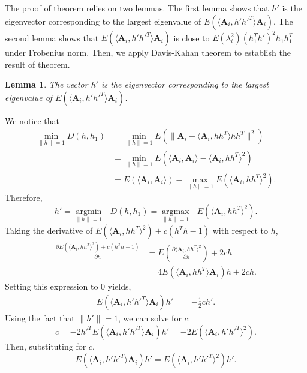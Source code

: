 \documentclass[10pt,journal,compsoc]{IEEEtran}
\newtheorem{lemma}[theorem]{Lemma}
\newenvironment{proof}[1][Proof]{\begin{trivlist}
		\item[\hskip \labelsep {\bfseries #1}]}{\end{trivlist}}
\newcommand{\bA}{\mathbf{A}}
\begin{document}
\begin{proof} [Proof of Theorem 4.2]
The proof of theorem relies on two lemmas. The first lemma shows that
$h'$ is the eigenvector corresponding to the largest eigenvalue of $E(\langle \bA_{i},h' h'^T \rangle \bA_{i})$. The second lemma shows that $E(\langle \bA_{i},h' h'^T \rangle \bA_{i})$ is close to $E(\lambda_i^2) (h_1^Th')^2 h_1 h_1^T$ under Frobenius norm. Then, we apply Davis-Kahan theorem \cite{davis1970rotation} to establish the result of theorem.\\
\begin{lemma}
	The vector $h'$ is the eigenvector corresponding to the largest eigenvalue of $E(\langle \bA_{i},h' h'^T \rangle \bA_{i})$.
\end{lemma}
	We notice that
	\begin{align*}
	\underset{\|h\| =1}{\operatorname{min}}D(h,h_1) &=\underset{\|h\| =1}{\operatorname{min}}E(\|\bA_i- \langle \bA_i,h h^T \rangle h h^T\|^2) \\
	&=\underset{\|h\| =1}{\operatorname{min}}E(\langle \bA_i,\bA_i \rangle- \langle \bA_i,h h^T \rangle ^2) \\
	&=E(\langle \bA_i,\bA_i \rangle)-\underset{\|h\| =1}{\operatorname{max}}E( \langle \bA_i,h h^T \rangle ^2).
	\end{align*}
	Therefore, 
	\begin{equation} \label{eq:5}
	h'= \underset{\|h\| =1}{\operatorname{argmin}} \text{ }D(h,h_1)=\underset{\|h\| =1}{\operatorname{argmax}} \text{ } E(\langle \bA_i,h h^T \rangle ^2) .
	\end{equation}
	Taking the derivative of $E( \langle \bA_i,h h^T \rangle ^2)+ c(h^Th-1)$ with respect to $h$,
	\begin{align*}
	\frac{\partial E( \langle \bA_i,h h^T \rangle ^2)+ c(h^Th-1) }{\partial h} & =  E(\frac{\partial  \langle \bA_i,h h^T \rangle ^2}{\partial h}) +2ch \\
	&=4 E( \langle \bA_i,h h^T \rangle \bA_i)h +2ch .
	\end{align*}
	Setting this expression to $0$ yields,
	\begin{align*} 
	E( \langle \bA_i,h' h'^T \rangle \bA_i)h' & = -\frac{1}{2}ch' .
	\end{align*}
	Using the fact that $\|h'\|=1$, we can solve for $c$:
	\[c = -2 h'^T E( \langle \bA_i,h' h'^T \rangle \bA_i)h' = -2 E( \langle \bA_i,h' h'^T \rangle^2) .\]
	Then, substituting for $c$, 
	\begin{equation}
	E( \langle \bA_i,h' h'^T \rangle \bA_i)h'=E( \langle \bA_i,h' h'^T \rangle^2)h'.

\end{equation}
\end{proof}
\end{document}
